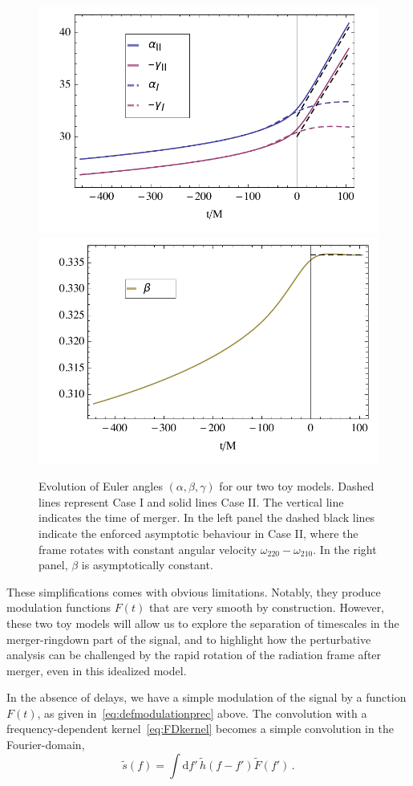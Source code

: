 \documentclass[aps,showpacs,%
prd,superscriptaddress,nofootinbib]{revtex4}
\newcommand{\be}{\begin{equation}}
\newcommand{\ee}{\end{equation}}
\newcommand\ud{{\mathrm{d}}}
\begin{document}
\begin{figure}
  \centering
  \includegraphics[width=.48\linewidth]{plots/prectoymodelalphagamma.pdf}
  \hspace{0.2cm}
  \includegraphics[width=.48\linewidth]{plots/prectoymodelbeta.pdf}
  \caption{Evolution of Euler angles $(\alpha, \beta, \gamma)$ for our two toy models. Dashed lines represent Case I and solid lines Case II. The vertical line indicates the time of merger. In the left panel the dashed black lines indicate the enforced asymptotic behaviour in Case II, where the frame rotates with constant angular velocity $\omega_{220} -\omega_{210}$. In the right panel, $\beta$ is asymptotically constant.}
  \label{fig:prectoymodel}
\end{figure}

These simplifications comes with obvious limitations. Notably, they produce modulation functions $F(t)$ that are very smooth by construction. However, these two toy models will allow us to explore the separation of timescales in the merger-ringdown part of the signal, and to highlight how the perturbative analysis can be challenged by the rapid rotation of the radiation frame after merger, even in this idealized model.

In the absence of delays, we have a simple modulation of the signal by a function $F(t)$, as given in~\eqref{eq:defmodulationprec} above. The convolution with a frequency-dependent kernel~\eqref{eq:FDkernel} becomes a simple convolution in the Fourier-domain,
\be\label{eq:convolution}
	\tilde{s} (f) = \int \ud f' \, \tilde{h}(f-f') \tilde{F} (f') \,.
\ee
\end{document}

